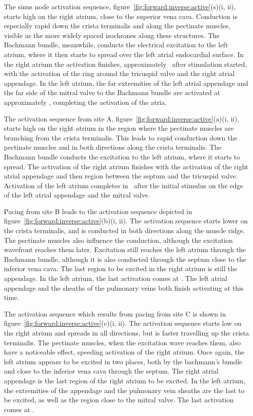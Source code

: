 The sinus node activation sequence,
figure~\ref{fig:forward:inverse:active}(s)(i, ii), starts high on the right
atrium, close to the superior vena cava.
Conduction is especially rapid down the crista terminalis and along the
pectinate muscles, visible as the more widely spaced isochrones along these
structures.
The Bachmann bundle, meanwhile, conducts the electrical excitation to the left
atrium, where it then starts to spread over the left atrial endocardial surface.
In the right atrium the activation finishes, approximately \ after
stimulation started, with the activation of the ring around the tricuspid valve
and the right atrial appendage.
In the left atrium, the far extremities of the left atrial appendage and the far
side of the mitral valve to the Bachmann bundle are activated at approximately
, completing the activation of the atria.

The activation sequence from site A,
figure~\ref{fig:forward:inverse:active}(a)(i, ii), starts high on the right
atrium in the region where the pectinate muscles are branching from the crista
terminalis.
This leads to rapid conduction down the pectinate muscles and in both directions
along the crista terminalis.
The Bachmann bundle conducts the excitation to the left atrium, where it starts
to spread.
The activation of the right atrium finishes with the activation of the right
atrial appendage and then region between the septum and the tricuspid valve.
Activation of the left atrium completes in \ after the initial stimulus
on the edge of the left atrial appendage and the mitral valve.

Pacing from site B leads to the activation sequence depicted in
figure~\ref{fig:forward:inverse:active}(b)(i, ii).
The activation sequence starts lower on the crista terminalis, and is conducted
in both directions along the muscle ridge.
The pectinate muscles also influence the conduction, although the excitation
wavefront reaches them later.
Excitation still reaches the left atrium through the Bachmann bundle, although
it is also conducted through the septum close to the inferior vena cava.
The last region to be excited in the right atrium is still the appendage.
In the left atrium, the last activation comes at .
The left atrial appendage and the sheaths of the pulmonary veins both finish
activating at this time.

The activation sequence which results from pacing from site C is shown in
figure~\ref{fig:forward:inverse:active}(c)(i, ii).
The activation sequence starts low on the right atrium and spreads in all
directions, but is faster travelling up the crista terminalis.
The pectinate muscles, when the excitation wave reaches them, also have a
noticeable effect, speeding activation of the right atrium.
Once again, the left atrium appears to be excited in two places, both by the
bachmann's bundle and close to the inferior vena cava through the septum.
The right atrial appendage is the last region of the right atrium to be excited.
In the left atrium, the extremities of the appendage and the pulmonary vein
sheaths are the last to be excited, as well as the region close to the mitral
valve.
The last activation comes at .

